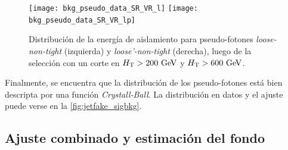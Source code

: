 



\begin{figure}[!htbp]
  \centering

  \texttt{[image: bkg\_pseudo\_data\_SR\_VR\_l]}
  \texttt{[image: bkg\_pseudo\_data\_SR\_VR\_lp]}

  \caption{Distribución de la energía de aislamiento para pseudo-fotones \emph{loose-non-tight} (izquierda) y \emph{loose'-non-tight} (derecha),
    luego de la selección con un corte en $\HT>200 \gev$ y $\HT>600 \gev$.}
  \label{fig:jetfake_pseudo_data_LR_VR}

\end{figure}

Finalmente, se encuentra que la distribución de los pseudo-fotones está bien
descripta por una función \emph{Crystall-Ball}. La
distribución en datos y el ajuste puede verse en la \cref{fig:jetfake_sigbkg}.




\subsection{Ajuste combinado y estimación del fondo} \label{sec:jet_fake_results}


